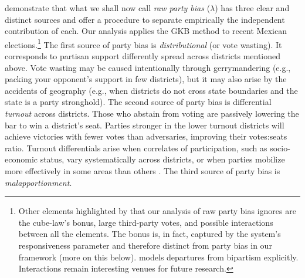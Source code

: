 \documentclass[letter,12pt]{article}
\begin{document}
\citet{grofman.etalBiasMalapp.1997} demonstrate that what we shall now call \emph{raw party bias} ($\lambda$) has three clear and distinct sources and offer a procedure to separate empirically the independent contribution of each. Our analysis applies the GKB method to recent Mexican elections.\footnote{Other elements highlighted by \citet{gudgin.taylor.1980decomposeBias} that our analysis of raw party bias ignores are the cube-law's bonus, large third-party votes, and possible interactions between all the elements. The bonus is, in fact, captured by the system's responsiveness parameter and therefore distinct from party bias in our framework (more on this below). \citet{calvo.2009roadToPR} models departures from bipartism explicitly. Interactions remain interesting venues for future research.} The first source of party bias is \emph{distributional} (or vote wasting). It corresponds to partisan support differently spread across districts mentioned above. Vote wasting may be caused intentionally through gerrymandering (e.g., packing your opponent's support in few districts), but it may also arise by the accidents of geography (e.g., when districts do not cross state boundaries and the state is a party stronghold). The second source of party bias is differential \emph{turnout} across districts. Those who abstain from voting are passively lowering the bar to win a district's seat. Parties stronger in the lower turnout districts will achieve victories with fewer votes than adversaries, improving their votes:seats ratio. Turnout differentials arise when correlates of participation, such as socio-economic status, vary systematically across districts, or when parties mobilize more effectively in some areas than others \citep{rosenstone.hansen.1993}. The third source of party bias is \emph{malapportionment}. 
\end{document}
